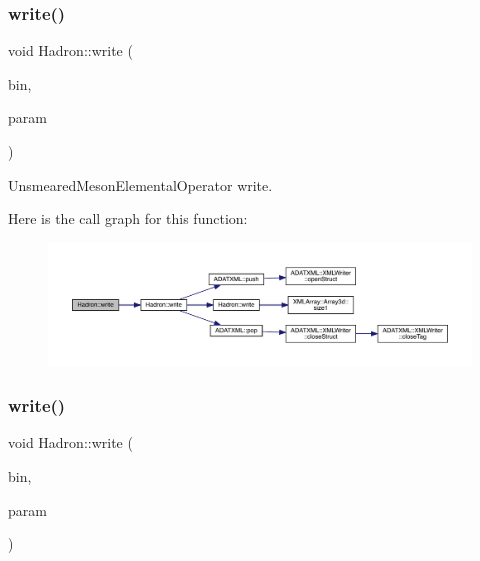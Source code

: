 \subsubsection{\texorpdfstring{write()}{write()}\hspace{0.1cm}{\footnotesize\ttfamily [69/95]}}
{\footnotesize\ttfamily void Hadron\+::write (\begin{DoxyParamCaption}\item[{\mbox{\hyperlink{classADATIO_1_1BinaryWriter}{Binary\+Writer}} \&}]{bin,  }\item[{const \mbox{\hyperlink{structHadron_1_1ValUnsmearedMesonElementalOperator__t}{Val\+Unsmeared\+Meson\+Elemental\+Operator\+\_\+t}} \&}]{param }\end{DoxyParamCaption})}



Unsmeared\+Meson\+Elemental\+Operator write. 

Here is the call graph for this function\+:\nopagebreak
\begin{figure}[H]
\begin{center}
\leavevmode
\includegraphics[width=350pt]{d1/daf/namespaceHadron_a78737ee2e9f7f708d926ec9f531c8f61_cgraph}
\end{center}
\end{figure}
\mbox{\label{namespaceHadron_a6ba238c6945bb5d95ae189cfee93a690}} 
\subsubsection{\texorpdfstring{write()}{write()}\hspace{0.1cm}{\footnotesize\ttfamily [70/95]}}
{\footnotesize\ttfamily void Hadron\+::write (\begin{DoxyParamCaption}\item[{\mbox{\hyperlink{classADATIO_1_1BinaryWriter}{Binary\+Writer}} \&}]{bin,  }\item[{const \mbox{\hyperlink{structHadron_1_1ValBaryonElementalOperator__t}{Val\+Baryon\+Elemental\+Operator\+\_\+t}} \&}]{param }\end{DoxyParamCaption})}



